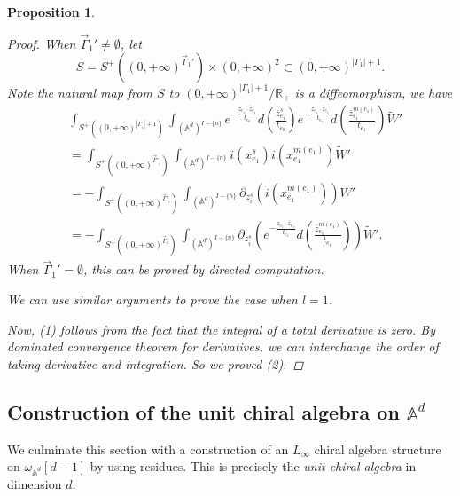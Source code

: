 \documentclass[11pt]{amsart}
\newtheorem{prop}[thm]{Proposition}
\theoremstyle{definition}
\theoremstyle{remark}
\numberwithin{equation}{section}
\begin{document}
\begin{prop}
\begin{proof}
        When $\vec{\Gamma}_{1}'\neq\emptyset$, let
        $$
        S=S^{+}((0,+\infty)^{\vec{\Gamma}_{1}'})\times(0,+\infty)^{2}\subset(0,+\infty)^{|\Gamma_{1}|+1}.
        $$
        Note the natural map from $S$ to $(0,+\infty)^{|\Gamma_{1}|+1}/\mathbb{R}_+$ is a diffeomorphism, we have
        \begin{align*}
            &\int_{S^{+}((0,+\infty)^{|\Gamma_{_{1}}|+1})}\int_{(\mathbb{A}^{d})^{ I-\{n\}}}
            e^{-\frac{z_{e_{1}}\cdot \bar{z}_{e_{1}}}{t_{e_{0}}}}d(\frac{\bar{z}_{e_{1}}^{s}}{t_{e_{0}}})e^{-\frac{z_{e_{1}}\cdot \bar{z}_{e_{1}}}{t_{e_{1}}}}d(\frac{\bar{z}_{e_{1}}^{m(e_{1})}}{t_{e_{1}}})\tilde{W}'\\
            &=
            \int_{S^{+}((0,+\infty)^{\vec{\Gamma}'_{_{1}}})}\int_{(\mathbb{A}^{d})^{ I-\{n\}}}i(x_{e_{1}}^{s})i(x_{e_{1}}^{m(e_{1})})\tilde{W}'\\
            &=
            -\int_{S^{+}((0,+\infty)^{\vec{\Gamma}'_{_{1}}})}\int_{(\mathbb{A}^{d})^{ I-\{n\}}}\partial_{z_{i}^{s}}(i(x_{e_{1}}^{m(e_{1})}))\tilde{W}'\\
            &=
            -\int_{S^{+}((0,+\infty)^{\vec{\Gamma}_{1}})}\int_{(\mathbb{A}^{d})^{ I-\{n\}}}\partial_{z_{i}^{s}}\left(e^{-\frac{z_{e_{1}}\cdot \bar{z}_{e_{1}}}{t_{e_{1}}}}d(\frac{\bar{z}_{e_{1}}^{m(e_{1})}}{t_{e_{1}}})\right)\tilde{W}'.
        \end{align*}
        When $\vec{\Gamma}_{1}'=\emptyset$, this can be proved by directed computation.

        We can use similar arguments to prove the case when $l=1$.

        Now, (1) follows from the fact that the integral of a total derivative is zero. By dominated convergence theorem for derivatives, we can interchange the order of taking derivative and integration. So we proved (2).
    \end{proof}
\end{prop}
\subsection{Construction of the unit chiral algebra on $\mathbb{A}^d$} \label{s:unit}

We culminate this section with a construction of an $L_{\infty}$ chiral algebra structure on $\omega_{\mathbb{A}^{d}}[d-1]$ by using residues.
This is precisely the \textit{unit chiral algebra} in dimension $d$.
\end{document}

